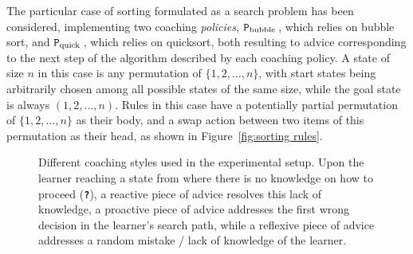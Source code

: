 \documentclass[a4paper,twoside]{article}
\newcommand{\bubblecoach}{\ensuremath{\texttt{P}_{\rm bubble}}\,}
\newcommand{\quickcoach}{\ensuremath{\texttt{P}_{\rm quick}}\,}
\newcommand{\qmark}{\texttt{\textbf{?}}}
\begin{document}
The particular case of sorting formulated as a search problem has been considered, implementing two coaching \emph{policies}, \bubblecoach, which relies on bubble sort, and \quickcoach, which relies on quicksort, both resulting to advice corresponding to the next step of the algorithm described by each coaching policy. A state of size $n$ in this case is any permutation of $\{1,2,\ldots,n\}$, with start states being arbitrarily chosen among all possible states of the same size, while the goal state is always $(1,2,\ldots,n)$. Rules in this case have a potentially partial permutation of $\{1,2,\ldots,n\}$ as their body, and a swap action between two items of this permutation as their head, as shown in Figure~\ref{fig:sorting rules}.

\begin{figure}[!tb]
	\centering
	
	\caption{Different coaching styles used in the experimental setup. Upon the learner reaching a state from where there is no knowledge on how to proceed (\textcolor{unknownColor}{\qmark}), a reactive piece of advice resolves this lack of knowledge, a proactive piece of advice addresses the first wrong decision in the learner's search path, while a reflexive piece of advice addresses a random mistake / lack of knowledge of the learner.}
	\label{fig:coaching styles}
\end{figure}
\end{document}

